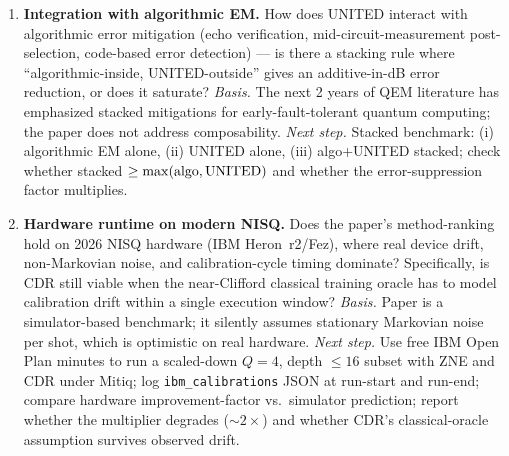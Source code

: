 \begin{enumerate}
  \item \textbf{Integration with algorithmic EM.}  How does UNITED
    interact with algorithmic error mitigation (echo verification,
    mid-circuit-measurement post-selection, code-based error
    detection) --- is there a stacking rule where
    ``algorithmic-inside, UNITED-outside'' gives an additive-in-dB
    error reduction, or does it saturate?
    \emph{Basis.} The next 2 years of QEM literature has emphasized
    stacked mitigations for early-fault-tolerant quantum computing;
    the paper does not address composability.
    \emph{Next step.} Stacked benchmark: (i) algorithmic EM alone,
    (ii) UNITED alone, (iii) algo+UNITED stacked; check whether
    stacked $\geq \max({\rm algo},{\rm UNITED})$ and whether the
    error-suppression factor multiplies.

  \item \textbf{Hardware runtime on modern NISQ.}  Does the paper's
    method-ranking hold on 2026 NISQ hardware (IBM Heron~r2/Fez), where
    real device drift, non-Markovian noise, and calibration-cycle
    timing dominate?  Specifically, is CDR still viable when the
    near-Clifford classical training oracle has to model calibration
    drift within a single execution window?
    \emph{Basis.} Paper is a simulator-based benchmark; it silently
    assumes stationary Markovian noise per shot, which is optimistic
    on real hardware.
    \emph{Next step.} Use free IBM Open Plan minutes to run a
    scaled-down $Q=4$, depth $\leq 16$ subset with ZNE and CDR under
    Mitiq; log \texttt{ibm\_calibrations} JSON at run-start and
    run-end; compare hardware improvement-factor vs.\ simulator
    prediction; report whether the multiplier degrades ($\sim 2\times$)
    and whether CDR's classical-oracle assumption survives observed
    drift.
\end{enumerate}
